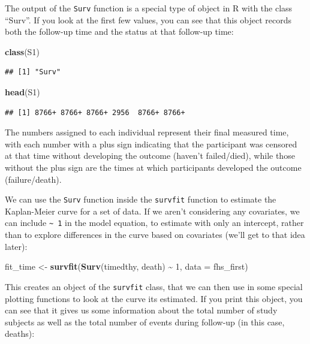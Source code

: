 \documentclass[
]{book}
\newenvironment{Shaded}{\begin{snugshade}}{\end{snugshade}}
\newcommand{\AttributeTok}[1]{\textcolor[rgb]{0.13,0.29,0.53}{#1}}
\newcommand{\DecValTok}[1]{\textcolor[rgb]{0.00,0.00,0.81}{#1}}
\newcommand{\FunctionTok}[1]{\textcolor[rgb]{0.13,0.29,0.53}{\textbf{#1}}}
\newcommand{\NormalTok}[1]{#1}
\newcommand{\OtherTok}[1]{\textcolor[rgb]{0.56,0.35,0.01}{#1}}
\newcommand{\SpecialCharTok}[1]{\textcolor[rgb]{0.81,0.36,0.00}{\textbf{#1}}}
\begin{document}
The output of the \texttt{Surv} function is a special type of object in R with the class ``Surv''. If you look at the first few values, you can see that this object records both the follow-up time and the status at that follow-up time:

\begin{Shaded}
\begin{Highlighting}[]
\FunctionTok{class}\NormalTok{(S1)}
\end{Highlighting}
\end{Shaded}

\begin{verbatim}
## [1] "Surv"
\end{verbatim}

\begin{Shaded}
\begin{Highlighting}[]
\FunctionTok{head}\NormalTok{(S1)}
\end{Highlighting}
\end{Shaded}

\begin{verbatim}
## [1] 8766+ 8766+ 8766+ 2956  8766+ 8766+
\end{verbatim}

The numbers assigned to each individual represent their final measured time, with each number with a plus sign indicating that the participant was censored at that time without developing the outcome (haven't failed/died), while those without the plus sign are the times at which participants developed the outcome (failure/death).

We can use the \texttt{Surv} function inside the \texttt{survfit} function to estimate the Kaplan-Meier curve for a set of data. If we aren't considering any covariates, we can include \texttt{\textasciitilde{}\ 1} in the model equation, to estimate with only an intercept, rather than to explore differences in the curve based on covariates (we'll get to that idea later):

\begin{Shaded}
\begin{Highlighting}[]
\NormalTok{fit\_time }\OtherTok{\textless{}{-}} \FunctionTok{survfit}\NormalTok{(}\FunctionTok{Surv}\NormalTok{(timedthy, death) }\SpecialCharTok{\textasciitilde{}} \DecValTok{1}\NormalTok{, }\AttributeTok{data =}\NormalTok{ fhs\_first)}
\end{Highlighting}
\end{Shaded}

This creates an object of the \texttt{survfit} class, that we can then use in some special plotting functions to look at the curve its estimated. If you print this object, you can see that it gives us some information about the total number of study subjects as well as the total number of events during follow-up (in this case, deaths):
\end{document}
